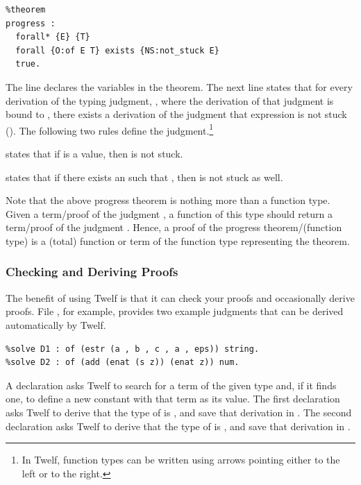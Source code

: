 \begin{verbatim}
%theorem
progress :
  forall* {E} {T}
  forall {O:of E T} exists {NS:not_stuck E}
  true.
\end{verbatim}

The  line declares the variables in the theorem.
The next line states that for every derivation of the typing judgment,
, where the derivation of that judgment is bound to , there
exists a derivation of the judgment that expression  is
not stuck ().
The following two rules define the  judgment.\footnote{
In Twelf, function types can be written using arrows
pointing either to the left or to the right.}

 states that if
 is a value, then  is not stuck.

 states that if
there exists an  such that ,
then  is not stuck as well.

Note that the above progress theorem is nothing more than a function
type.
Given a term/proof of the judgment ,
a function of this type should return a term/proof of
the judgment .
Hence, a proof of the progress theorem/(function type) is a (total)
function or term of the function type representing the theorem.

\subsubsection{Checking and Deriving Proofs}
The benefit of using Twelf is that it can check your proofs
and occasionally derive proofs.
File , for example, provides two
example judgments that can be derived automatically by Twelf.

\begin{verbatim}
%solve D1 : of (estr (a , b , c , a , eps)) string.
%solve D2 : of (add (enat (s z)) (enat z)) num.
\end{verbatim}

A  declaration asks Twelf to search for a term
of the given type and, if it finds one, to define a new
constant with that term as its value.
The first declaration asks Twelf to derive that the type of
 is ,
and save that derivation in .
The second declaration asks Twelf to derive that the
type of  is ,
and save that derivation in .

